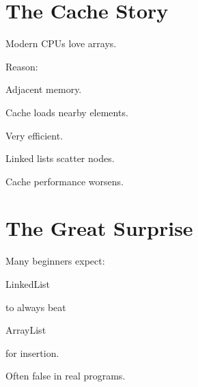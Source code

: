 \documentclass[11pt,a4paper]{book}
\begin{document}

\section{The Cache Story}

Modern CPUs love arrays.


Reason:


Adjacent memory.


Cache loads nearby elements.


Very efficient.


Linked lists scatter nodes.


Cache performance worsens.


\section{The Great Surprise}

Many beginners expect:


LinkedList


to always beat


ArrayList


for insertion.


Often false in real programs.

\end{document}
